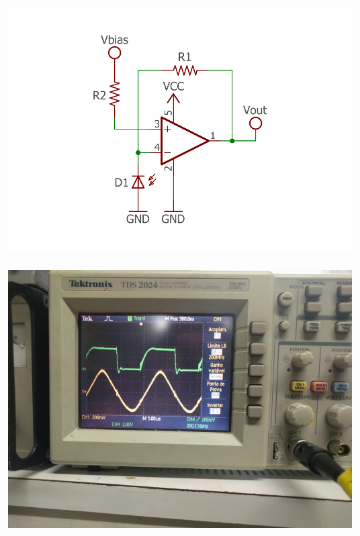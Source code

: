 	\begin{figure}[htb]
		\caption{\label{fig_transimpedance_amp_complex_outer} Circuito e saída de um amplificador de impedâncias. No circuito, o fotodiodo é reversamente polarizado por $V_{bias}$. No osciloscópio, a saída está marcada em amarelo enquanto a saída do LED está em verde.}
		\begin{subfigure}{.5\textwidth}
			\centering
			\includegraphics[width=1\textwidth, trim={1cm 1cm 1cm 2cm}, clip]{circuits/transimpedance_amp.pdf}
		\end{subfigure}
		\begin{subfigure}{.5\textwidth}
			\centering
			\includegraphics[width=1\textwidth, trim={25cm 35cm 40cm 15cm}, clip]{circuits/photos/RX_TIA_result.jpg}
		\end{subfigure}
	\end{figure}

